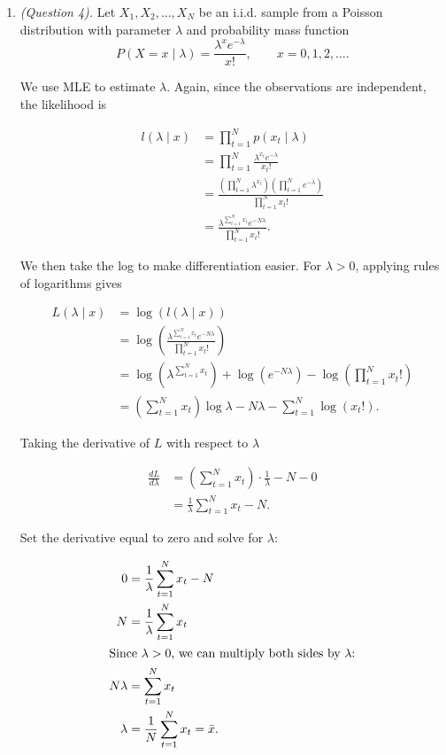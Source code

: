 \documentclass[12pt]{article}
\begin{document}
\begin{enumerate}
\item \emph{(Question 4).} Let $X_1, X_2, \ldots, X_N$ be an i.i.d. sample from a Poisson distribution with parameter $\lambda$ and probability mass function
\[
P(X=x\mid\lambda)=\frac{\lambda^x e^{-\lambda}}{x!},
\qquad x=0,1,2,\ldots.
\]

We use MLE to estimate $\lambda$. Again, since the observations are independent, the likelihood is

\[
\begin{aligned}
l(\lambda\mid x)
&= \prod_{t=1}^N p(x_t\mid\lambda) \\
&= \prod_{t=1}^N \frac{\lambda^{x_t}e^{-\lambda}}{x_t!} \\
&= \frac{\left(\prod_{t=1}^N\lambda^{x_t}\right)
   \left(\prod_{t=1}^N e^{-\lambda}\right)}{\prod_{t=1}^N x_t!} \\
&= \frac{\lambda^{\sum_{t=1}^N x_t}e^{-N\lambda}}{\prod_{t=1}^N x_t!}.
\end{aligned}
\]

We then take the log to make differentiation easier. For $\lambda>0$, applying rules of logarithms gives

\[
\begin{aligned}
L(\lambda\mid x)
&= \log\left(l(\lambda\mid x)\right) \\
&= \log\left(\frac{\lambda^{\sum_{t=1}^N x_t}e^{-N\lambda}}{\prod_{t=1}^N x_t!}\right) \\
&= \log\left(\lambda^{\sum_{t=1}^N x_t}\right)
   + \log\left(e^{-N\lambda}\right)
   - \log\left(\prod_{t=1}^N x_t!\right) \\
&= \left(\sum_{t=1}^N x_t\right)\log\lambda
   - N\lambda - \sum_{t=1}^N\log(x_t!).
\end{aligned}
\]

Taking the derivative of $L$ with respect to $\lambda$

\[
\begin{aligned}
\frac{dL}{d\lambda}
&= \left(\sum_{t=1}^N x_t\right)\cdot\frac{1}{\lambda} - N - 0 \\
&= \frac{1}{\lambda}\sum_{t=1}^N x_t-N.
\end{aligned}
\]

Set the derivative equal to zero and solve for $\lambda$:

\begin{align*}
0 &= \frac{1}{\lambda}\sum_{t=1}^N x_t-N \\
N &= \frac{1}{\lambda}\sum_{t=1}^N x_t \\
\intertext{Since $\lambda>0$, we can multiply both sides by $\lambda$:}
N\lambda &= \sum_{t=1}^N x_t \\
\lambda &= \frac{1}{N}\sum_{t=1}^N x_t=\bar{x}.
\end{align*}


\end{enumerate}
\end{document}
